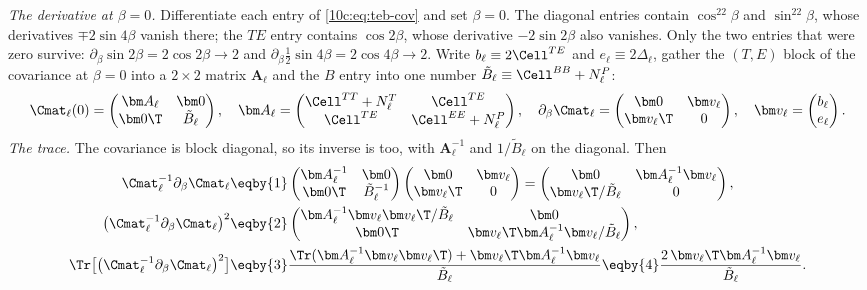 \emph{The derivative at $\beta=0$.} Differentiate each entry of \eqref{10c:eq:teb-cov} and set $\beta=0$. The
diagonal entries contain $\cos^22\beta$ and $\sin^22\beta$, whose derivatives $\mp2\sin4\beta$ vanish there; the $TE$
entry contains $\cos2\beta$, whose derivative $-2\sin2\beta$ also vanishes. Only the two entries that were zero
survive: $\partial_\beta\sin2\beta=2\cos2\beta\to2$ and $\partial_\beta\tfrac12\sin4\beta=2\cos4\beta\to2$. Write
$b_\ell\equiv2\Cell^{TE}$ and $e_\ell\equiv2\Delta_\ell$, gather the $(T,E)$ block of the covariance at $\beta=0$
into a $2\times2$ matrix $\bm A_\ell$ and the $B$ entry into one number $\tilde B_\ell\equiv\Cell^{BB}+N^P_\ell$:
\begin{equation}
  \Cmat_\ell(0)=\begin{pmatrix}\bm A_\ell&\bm0\\ \bm0\T&\tilde B_\ell\end{pmatrix},\quad
  \bm A_\ell=\begin{pmatrix}\Cell^{TT}+N^T_\ell&\Cell^{TE}\\ \Cell^{TE}&\Cell^{EE}+N^P_\ell\end{pmatrix},\quad
  \partial_\beta\Cmat_\ell=\begin{pmatrix}\bm0&\bm v_\ell\\ \bm v_\ell\T&0\end{pmatrix},\quad
  \bm v_\ell=\begin{pmatrix}b_\ell\\ e_\ell\end{pmatrix}.
  \label{10c:eq:blocks}
\end{equation}
\emph{The trace.} The covariance is block diagonal, so its inverse is too, with $\bm A_\ell^{-1}$ and $1/\tilde B_\ell$
on the diagonal. Then
\begin{align}
  \Cmat_\ell^{-1}\partial_\beta\Cmat_\ell
  &\eqby{1}\begin{pmatrix}\bm A_\ell^{-1}&\bm0\\ \bm0\T&\tilde B_\ell^{-1}\end{pmatrix}
           \begin{pmatrix}\bm0&\bm v_\ell\\ \bm v_\ell\T&0\end{pmatrix}
   =\begin{pmatrix}\bm0&\bm A_\ell^{-1}\bm v_\ell\\ \bm v_\ell\T/\tilde B_\ell&0\end{pmatrix},
  \nonumber\\
  \bigl(\Cmat_\ell^{-1}\partial_\beta\Cmat_\ell\bigr)^2
  &\eqby{2}\begin{pmatrix}\bm A_\ell^{-1}\bm v_\ell\bm v_\ell\T/\tilde B_\ell&\bm0\\ \bm0\T&\bm v_\ell\T\bm A_\ell^{-1}\bm v_\ell/\tilde B_\ell\end{pmatrix},
  \nonumber\\
  \Tr\bigl[\bigl(\Cmat_\ell^{-1}\partial_\beta\Cmat_\ell\bigr)^2\bigr]
  &\eqby{3}\frac{\Tr(\bm A_\ell^{-1}\bm v_\ell\bm v_\ell\T)+\bm v_\ell\T\bm A_\ell^{-1}\bm v_\ell}{\tilde B_\ell}
   \eqby{4}\frac{2\,\bm v_\ell\T\bm A_\ell^{-1}\bm v_\ell}{\tilde B_\ell}.
  \label{10c:eq:trace}
\end{align}
